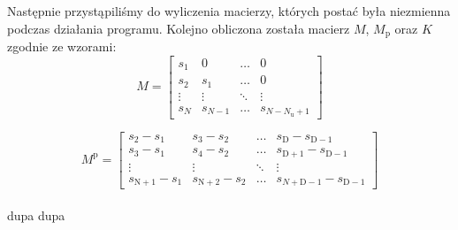 Następnie przystąpiliśmy do wyliczenia macierzy, których postać była niezmienna podczas działania programu. Kolejno obliczona została macierz $M$, $M_\mathrm{p}$ oraz $K$ zgodnie ze wzorami:
\\

\begin{equation}
M=\left[
\begin{array}
{cccc}
s_{1} & 0 & \ldots & 0\\
s_{2} & s_{1} & \ldots & 0\\
\vdots & \vdots & \ddots & \vdots\\
s_{N} & s_{N-1} & \ldots &  s_{N-N_{\mathrm{u}}+1}
\end{array}
\right]
\end{equation}

\begin{equation}
M^{\mathrm{p}}=\left[
\begin{array}
{cccc}
s_{\mathrm{2}} - s_{\mathrm{1}} & s_{\mathrm{3}} - s_{\mathrm{2}} & \ldots & s_{\mathrm{D}} - s_{\mathrm{D-1}}\\
s_{\mathrm{3}} - s_{\mathrm{1}} & s_{\mathrm{4}} - s_{\mathrm{2}} & \ldots & s_{\mathrm{D+1}} - s_{\mathrm{D-1}}\\
\vdots & \vdots & \ddots & \vdots\\
s_{\mathrm{N+1}} - s_{1} & s_{\mathrm{N+2}} - s_{\mathrm{2}} & \ldots &  s_{N + \mathrm{D} - 1} - s_{{\mathrm{D-1}}}
\end{array}
\right]
\end{equation}
\\
dupa dupa

